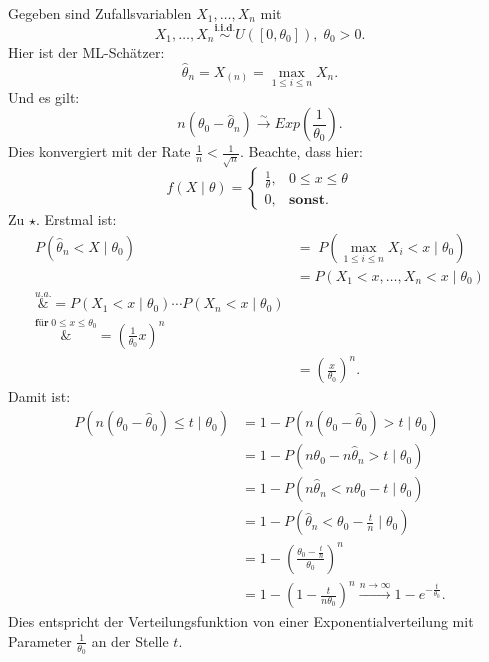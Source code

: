 \documentclass[10pt]{article}
\newcommand{\FZV}{X_1, \ldots, X_n} %
\newcommand{\KV}{\overset{\sim} \longrightarrow} %
\newcommand{\eqname}[1]{\tag*{#1}}%
\newenvironment{BSP}[1][]
{\begin{Beispiel}[frametitle=#1]}{\end{Beispiel}}
\begin{document}
	\begin{BSP}[Beispiel 1.3.11 (Grenzverteilung keine Normalverteilung)]
		Gegeben sind Zufallsvariablen $\FZV$ mit
		\begin{equation*}
			\FZV \overset{\textbf{i.i.d.}}{\sim} U([0,\theta_0]), \; \theta_0 >0.
		\end{equation*}
		Hier ist der ML-Schätzer:
		\begin{equation*}
			\hat{\theta}_n = X_{(n)} = \underset{1\leq i \leq n}{\max} X_n. 
		\end{equation*}
		Und es gilt:
		\begin{equation*}
			n(\theta_0-\hat{\theta}_n) \KV Exp\left(\frac{1}{\theta_0}\right) \eqname{$\star$}.
		\end{equation*}
		Dies konvergiert mit der Rate $\frac{1}{n} < \frac{1}{\sqrt{n}}$.
		Beachte, dass hier:
		\begin{equation*}
			f(X\mid \theta) =
			\begin{cases}
				\frac{1}{\theta}, &0\leq x\leq \theta\\
				0, &\textbf{sonst}.
			\end{cases}
		\end{equation*}
		Zu $\star$. Erstmal ist:
		\begin{equation*}
			\begin{split}
				P(\hat{\theta}_n < X \mid \theta_0) &= \; P(\underset{1\leq i \leq n}{\max} X_i < x \mid \theta_0)\\
				&= P(X_1 < x, \ldots, X_n < x \mid \theta_0)\\
				\overset{u.a.}&{=} P(X_1<x\mid \theta_0) \cdots P(X_n < x \mid \theta_0)\\
				\overset{\textbf{für} \; 0 \leq x \leq \theta_0}&{=} \left(\frac{1}{\theta_0}x\right)^{n}\\
				&=\left(\frac{x}{\theta_0}\right)^n.
			\end{split}
		\end{equation*}
		Damit ist:
		\begin{equation*}
			\begin{split}
				P (n(\theta_0 -\hat{\theta}_0) \leq t \mid \theta_0) &= 1-P(n(\theta_0 -\hat{\theta}_0) > t \mid \theta_0) \\
				&= 1- P(n \theta_0 -n\hat{\theta}_n > t \mid \theta_0)\\
				&= 1- P(n\hat{\theta}_n < n\theta_0 - t \mid \theta_0)\\
				&= 1- P\left(\hat{\theta}_n < \theta_0 - \frac{t}{n} \mid \theta_0 \right)\\
				&= 1- \left(\frac{\theta_0 -\frac{t}{n}}{\theta_0}\right)^n\\
				&= 1- \left(1-\frac{t}{n \theta_0}\right)^n \overset{n\rightarrow \infty}\longrightarrow 1-e^{-\frac{t}{\theta_0}}.
			\end{split}
		\end{equation*}
		Dies entspricht der Verteilungsfunktion von einer Exponentialverteilung mit Parameter $\frac{1}{\theta_0}$ an der Stelle $t$.
		

\end{BSP}
\end{document}
